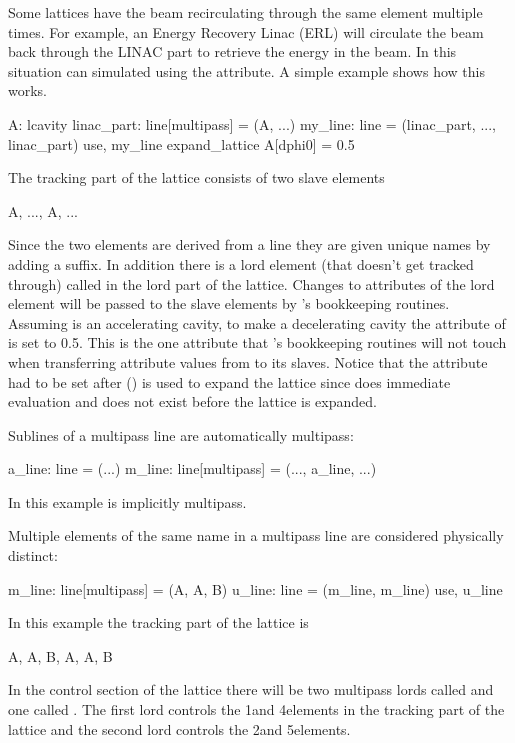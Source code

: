Some lattices have the beam recirculating through the same element
multiple times. For example, an Energy Recovery Linac (ERL) will
circulate the beam back through the LINAC part to retrieve the energy
in the beam. In \bmad this situation can simulated using the
 attribute. A simple example shows how this works.
\begin{example}
  A: lcavity
  linac_part: line[multipass] = (A, ...)
  my_line: line = (linac_part, ..., linac_part)
  use, my_line
  expand_lattice
  A[dphi0] = 0.5
\end{example}
The tracking part of the lattice consists of two slave elements
\begin{example}
  A, ..., A, ...
\end{example}
Since the two elements are derived from a  line they are
given unique names by adding a  suffix. In addition there is
a lord element (that doesn't get tracked through) called  in the
lord part of the lattice. Changes to attributes of the lord 
element will be passed to the slave elements by \bmad's bookkeeping
routines. Assuming  is an accelerating cavity, to make
 a decelerating cavity the  attribute of
 is set to 0.5. This is the one attribute that \bmad's
bookkeeping routines will not touch when transferring attribute values
from  to its slaves. Notice that the  attribute had to
be set after  ()
is used to expand the lattice since
\bmad does immediate evaluation and  does not exist before
the lattice is expanded.

Sublines of a multipass line are automatically multipass:
\begin{example}
  a_line: line = (...)
  m_line: line[multipass] = (..., a_line, ...)
\end{example}
In this example  is implicitly multipass.

Multiple elements of the same name in a multipass line are considered 
physically distinct:
\begin{example}
  m_line: line[multipass] = (A, A, B)
  u_line: line = (m_line, m_line)
  use, u_line
\end{example}
In this example the tracking part of the lattice is
\begin{example}
  A, A, B, A, A, B
\end{example}
In the control section of the lattice there will be two multipass
lords called  and one called . The first  lord 
controls the 1\St and 4\Th elements in the tracking part of the lattice 
and the second  lord controls the 2\Nd and 5\Th elements.

